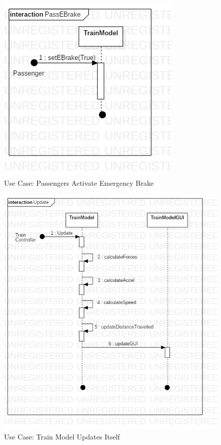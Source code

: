 \documentclass{article}
\begin{document}
    \begin{figure}[H]
        \centering
        \includegraphics[width=\textwidth]{./TrainModel/PassEBrake.png}
        \caption{Use Case: Passengers Activate Emergency Brake}
        \label{fig:Train Model Passenger Emergency Brake}
    \end{figure}
    \begin{figure}[H]
        \centering
        \includegraphics[width=\textwidth]{./TrainModel/Update.png}
        \caption{Use Case: Train Model Updates Itself}
        \label{fig:Train Model Block Info}
    \end{figure}
\end{document}
